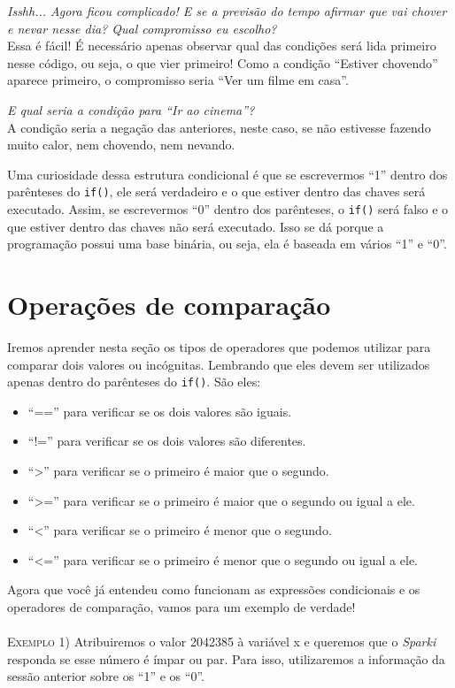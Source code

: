     \textit{Isshh... Agora ficou complicado! E se a previsão do tempo afirmar que vai chover e nevar nesse dia? Qual compromisso eu escolho?} 
    \\
    Essa é fácil! É necessário apenas observar qual das condições será lida primeiro nesse código, ou seja, o que vier primeiro! Como a condição ``Estiver chovendo'' aparece primeiro, o compromisso seria ``Ver um filme em casa''.
    
    \textit{E qual seria a condição para ``Ir ao cinema''?} 
    \\
    A condição seria a negação das anteriores, neste caso, se não estivesse fazendo muito calor, nem chovendo, nem nevando.
    
    Uma curiosidade dessa estrutura condicional é que se escrevermos ``1'' dentro dos parênteses do \texttt{if()}, ele será verdadeiro e o que estiver dentro das chaves será executado. Assim, se escrevermos ``0'' dentro dos parênteses, o \texttt{if()} será falso e o que estiver dentro das chaves não será executado. Isso se dá porque a programação possui uma base binária, ou seja, ela é baseada em vários ``1'' e ``0''.
    
    \section{Operações de comparação}
    
    Iremos aprender nesta seção os tipos de operadores que podemos utilizar para comparar dois valores ou incógnitas. Lembrando que eles devem ser utilizados apenas dentro do parênteses do \texttt{if()}. São eles:
    
    \begin{itemize}
        \item ``=='' para verificar se os dois valores são iguais.
        \item ``!='' para verificar se os dois valores são diferentes.
        \item ``>'' para verificar se o primeiro é maior que o segundo.
        \item ``>='' para verificar se o primeiro é maior que o segundo ou igual a ele.
        \item ``<'' para verificar se o primeiro é menor que o segundo.
        \item ``<='' para verificar se o primeiro é menor que o segundo ou igual a ele.
    \end{itemize}
    
    Agora que você já entendeu como funcionam as expressões condicionais e os operadores de comparação, vamos para um exemplo de verdade!
    \\
    \\
    \textsc{Exemplo 1)} Atribuiremos o valor 2042385 à variável x e queremos que o \textsl{Sparki} responda se esse número é ímpar ou par. Para isso, utilizaremos a informação da sessão anterior sobre os ``1'' e os ``0''.
    
